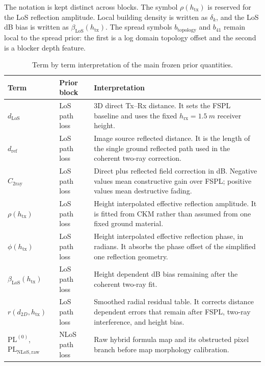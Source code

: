 The notation is kept distinct across blocks. The symbol
\(\rho(h_{\mathrm{tx}})\) is reserved for the LoS reflection amplitude.
Local building density is written as \(\delta_k\), and the LoS dB bias is
written as \(\beta_{\mathrm{LoS}}(h_{\mathrm{tx}})\). The spread symbols
\(b_{\mathrm{topology}}\) and \(b_{41}\) remain local to the spread prior:
the first is a log domain topology offset and the second is a blocker depth
feature.

\begin{table}[H]
\centering
\caption{Term by term interpretation of the main frozen prior quantities.}
\label{tab:prior_term_meanings}
\scriptsize
\renewcommand{\arraystretch}{1.0}
\begin{tabularx}{\textwidth}{>{\raggedright\arraybackslash}p{}
>{\raggedright\arraybackslash}p{}
>{\raggedright\arraybackslash}X}
\toprule
Term & Prior block & Interpretation \\
\midrule
\(d_{\mathrm{LoS}}\) & LoS path loss &
3D direct Tx--Rx distance. It sets the FSPL baseline and uses the fixed
\(h_{\mathrm{rx}}=\SI{1.5}{m}\) receiver height. \\
\(d_{\mathrm{ref}}\) & LoS path loss &
Image source reflected distance. It is the length of the single
ground reflected path used in the coherent two-ray correction. \\
\(C_{\mathrm{2ray}}\) & LoS path loss &
Direct plus reflected field correction in dB. Negative values mean constructive
gain over FSPL; positive values mean destructive fading. \\
\(\rho(h_{\mathrm{tx}})\) & LoS path loss &
Height interpolated effective reflection amplitude. It is fitted from CKM
rather than assumed from one fixed ground material. \\
\(\phi(h_{\mathrm{tx}})\) & LoS path loss &
Height interpolated effective reflection phase, in radians. It absorbs the
phase offset of the simplified one reflection geometry. \\
\(\beta_{\mathrm{LoS}}(h_{\mathrm{tx}})\) & LoS path loss &
Height dependent dB bias remaining after the coherent two-ray fit. \\
\(r(d_{2D},h_{\mathrm{tx}})\) & LoS path loss &
Smoothed radial residual table. It corrects distance dependent errors that
remain after FSPL, two-ray interference, and height bias. \\
\(\mathrm{PL}^{(0)}\), \(\mathrm{PL}_{\mathrm{NLoS,raw}}\) & NLoS path loss &
Raw hybrid formula map and its obstructed pixel branch before
map morphology calibration. \\

\end{tabularx}
\end{table}
